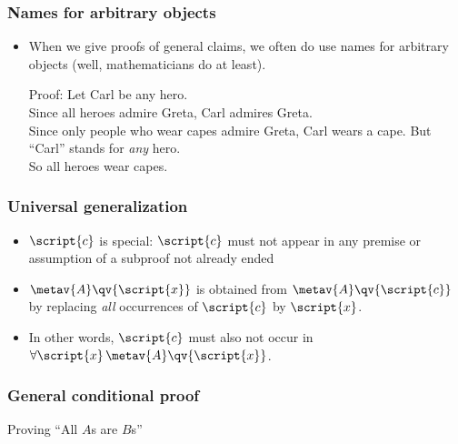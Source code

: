 \begin{frame}
\frametitle{Names for arbitrary objects}

\begin{itemize}[<+->]
\item When we give proofs of general claims, we often do use names for
arbitrary objects (well, mathematicians do at least).

\pause
Proof: Let Carl be any hero.  \\ Since all heroes admire Greta, Carl
admires Greta. \\ Since only people who wear capes admire Greta, Carl wears a cape. But ``Carl'' stands for \emph{any} hero. \\ So all heroes
wear capes.
\end{itemize}
\end{frame}

\begin{frame}
  \frametitle{Universal generalization}

\begin{fitchproof}
\end{fitchproof}
  \begin{itemize}[<+->]
  \item $\script{c}$ is special: $\script{c}$ must not appear in any
  premise or assumption of a subproof not already ended
  \item $\metav{A}\qv{\script{x}}$ is obtained from $\metav{A}\qv{\script{c}}$ by replacing \emph{all} occurrences of $\script{c}$ by $\script{x}$.
  \item In other words, $\script{c}$ must also not occur in $\forall
  \script{x}\,\metav{A}\qv{\script{x}}$.
 \end{itemize}
\end{frame}

\begin{frame}
\frametitle{General conditional proof}

Proving ``All $A$s are $B$s''

\begin{fitchproof}
  \open
   
  \close
\end{fitchproof}
\end{frame}

